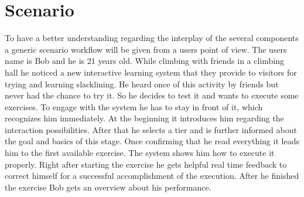 \section{Scenario}\label{4_6_scenario}
To have a better understanding regarding the interplay of the several components a generic scenario workflow will be given from a users point of view. The users name is Bob and he is 21 years old. While climbing with friends in a climbing hall he noticed a new interactive learning system that they provide to visitors for trying and learning slacklining. He heard once of this activity by friends but never had the chance to try it. So he decides to test it and wants to execute some exercises. To engage with the system he has to stay in front of it, which recognizes him immediately. At the beginning it introduces him regarding the interaction possibilities. After that he selects a tier and is further informed about the goal and basics of this stage. Once confirming that he read everything it leads him to the first available exercise. The system shows him how to execute it properly. Right after starting the exercise he gets helpful real time feedback to correct himself for a successful accomplishment of the execution. After he finished the exercise Bob gets an overview about his performance.


